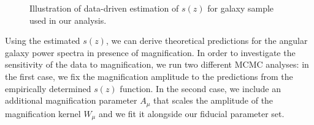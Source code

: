 \documentclass[a4paper,11pt]{article}
\begin{document}
    \begin{figure}
      \begin{center}
        \caption{Illustration of data-driven estimation of $s(z)$ for galaxy sample used in our analysis.} 
        \label{fig:s-func-estimation}
      \end{center}
    \end{figure}

    Using the estimated $s(z)$, we can derive theoretical predictions for the angular galaxy power spectra in presence of magnification. In order to investigate the sensitivity of the data to magnification, we run two different MCMC analyses: in the first case, we fix the magnification amplitude to the predictions from the empirically determined $s(z)$ function. In the second case, we include an additional magnification parameter $A_{\mu}$ that scales the amplitude of the magnification kernel $W_{\mu}$ and we fit it alongside our fiducial parameter set.
\end{document}
